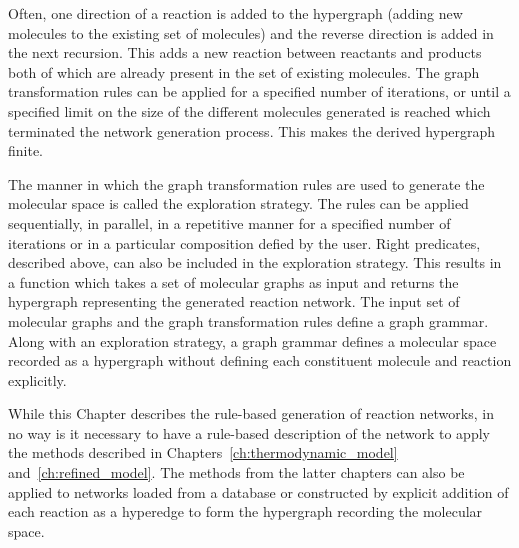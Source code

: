 Often, one direction of a reaction is added to the hypergraph (adding new molecules to the existing set of molecules) and the reverse direction is added in the next recursion. This adds a new reaction between reactants and products both of which are already present in the set of existing molecules.
The graph transformation rules can be applied for a specified number of iterations, or until a specified limit on the size of the different molecules generated is reached which terminated the network generation process. This makes the derived hypergraph finite.

The manner in which the graph transformation rules are used to generate the molecular space is called the exploration strategy. The rules can be applied sequentially, in parallel, in a repetitive manner for a specified number of iterations or in a particular composition defied by the user. 
Right predicates, described above, can also be included in the exploration strategy.
This results in a function which takes a set of molecular graphs as input and returns the hypergraph representing the generated reaction network. 
The input set of molecular graphs and the graph transformation rules define a graph grammar. Along with an exploration strategy, a graph grammar defines a molecular space recorded as a hypergraph without defining each constituent molecule and reaction explicitly.

While this Chapter describes the rule-based generation of reaction networks, in no way is it necessary to have a rule-based description of the network to apply the methods described in Chapters~\ref{ch:thermodynamic_model} and~\ref{ch:refined_model}. The methods from the latter chapters can also be applied to networks loaded from a database or constructed by explicit addition of each reaction as a hyperedge to form the hypergraph recording the molecular space.
